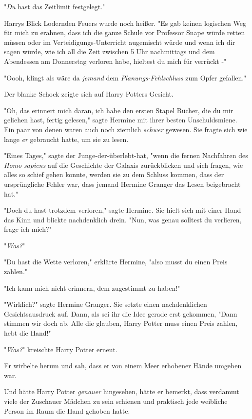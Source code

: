 {"\emph{Du} hast das Zeitlimit festgelegt."

Harrys Blick Lodernden Feuers wurde noch heißer. "Es gab keinen logischen Weg für mich zu erahnen, dass ich die ganze Schule vor Professor Snape würde retten müssen oder im Verteidigungs-Unterricht augemischt würde und wenn ich dir sagen würde, wie ich all die Zeit zwischen 5 Uhr nachmittags und dem Abendessen am Donnerstag verloren habe, hieltest du mich für verrückt -"

"Oooh, klingt als wäre da \emph{jemand} dem \emph{Planungs-Fehlschluss} zum Opfer gefallen."

Der blanke Schock zeigte sich auf Harry Potters Gesicht.

"Oh, das erinnert mich daran, ich habe den ersten Stapel Bücher, die du mir geliehen hast, fertig gelesen," sagte Hermine mit ihrer besten Unschuldsmiene. Ein paar von denen waren auch noch ziemlich \emph{schwer} gewesen. Sie fragte sich wie lange \emph{er} gebraucht hatte, um sie zu lesen.

"Eines Tages," sagte der Junge-der-überlebt-hat, "wenn die fernen Nachfahren des \emph{Homo} \emph{sapiens} auf die Geschichte der Galaxis zurückblicken und sich fragen, wie alles so schief gehen konnte, werden sie zu dem Schluss kommen, dass der ursprüngliche Fehler war, dass jemand Hermine Granger das Lesen beigebracht hat."

"Doch du hast trotzdem verloren," sagte Hermine. Sie hielt sich mit einer Hand das Kinn und blickte nachdenklich drein. "Nun, was genau solltest du verlieren, frage ich mich?"

"\emph{Was?}"

"Du hast die Wette verloren," erklärte Hermine, "also musst du einen Preis zahlen."

"Ich kann mich nicht erinnern, dem zugestimmt zu haben!"

"Wirklich?" sagte Hermine Granger. Sie setzte einen nachdenklichen Gesichtsausdruck auf. Dann, als sei ihr die Idee gerade erst gekommen, "Dann stimmen wir doch ab. Alle die glauben, Harry Potter muss einen Preis zahlen, hebt die Hand!"

"\emph{Was?}" kreischte Harry Potter erneut.

Er wirbelte herum und sah, dass er von einem Meer erhobener Hände umgeben war.

Und hätte Harry Potter \emph{genauer} hingesehen, hätte er bemerkt, dass verdammt viele der Zuschauer Mädchen zu sein schienen und praktisch jede weibliche Person im Raum die Hand gehoben hatte.

}
